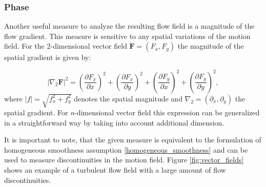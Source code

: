 \subsubsection{Phase}
\label{phase}

Another useful measure to analyze the resulting flow field is a magnitude of the flow gradient. This measure is sensitive to any spatial variations of the motion field. 
For the 2-dimensional vector field $\textbf{F}=(F_x,F_y)$ the magnitude of the spatial gradient is given by:

$$ |\nabla_2 \textbf{F}|^2 =   \left( \frac{\partial F_x}{\partial x} \right)^2 + \left( \frac{\partial F_x}{\partial y} \right)^2 + \left( \frac{\partial F_y}{\partial x} \right)^2 + \left( \frac{\partial F_y}{\partial y} \right)^2 ,$$
where  $|f| = \sqrt{f^2_x + f^2_y}$ denotes the spatial magnitude and $\nabla_2 = (\partial_{x}, \partial_{y})$ the spatial gradient. For \textit{n}-dimensional vector field this expression can be generalized in a straightforward way by taking into account additional dimension.

It is important to note, that the given measure is equivalent to the formulation of homogeneous smoothness assumption \ref{homogeneous_smoothness} and can be used to measure discontinuities in the motion field. Figure \ref{fig:vector_fields} shows an example of a turbulent flow field with a large amount of flow discontinuities. 
      

